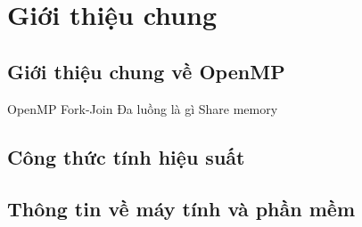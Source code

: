 \newpage
\section{Giới thiệu chung}
\subsection{Giới thiệu chung về OpenMP}

OpenMP
Fork-Join
Đa luồng là gì
Share memory
\subsection{Công thức tính hiệu suất}




\subsection{Thông tin về máy tính và phần mềm}




 
 
 